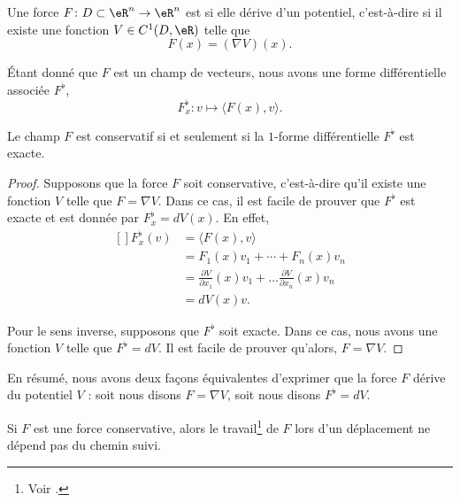 \begin{definition}
	Une force \( F\colon D\subset\eR^n\to \eR^n\) est  si elle dérive d'un potentiel, c'est-à-dire si il existe une fonction \( V\in C^1(D,\eR)\) telle que
	\begin{equation}
		F(x)=(\nabla V)(x).
	\end{equation}
\end{definition}
Étant donné que \( F\) est un champ de vecteurs, nous avons une forme différentielle associée \( F^{\flat}\),
\begin{equation}
	F^{\flat}_x\colon v\mapsto \langle F(x), v\rangle .
\end{equation}

\begin{lemma}
	Le champ \( F\) est conservatif si et seulement si la \( 1\)-forme différentielle \( F^{\flat}\) est exacte.
\end{lemma}

\begin{proof}
	Supposons que la force \( F\) soit conservative, c'est-à-dire qu'il existe une fonction \( V\) telle que \( F=\nabla V\). Dans ce cas, il est facile de prouver que \( F^{\flat}\) est exacte et est donnée par \( F_x^{\flat}=dV(x)\). En effet,
	\begin{equation}
		\begin{aligned}[]
			F_x^{\flat}(v) & =\langle F(x), v\rangle                                                                    \\
			               & =F_1(x)v_1+\cdots+F_n(x)v_n                                                                \\
			               & =\frac{ \partial V }{ \partial x_1 }(x)v_1+\ldots\frac{ \partial V }{ \partial x_n }(x)v_n \\
			               & =dV(x)v.
		\end{aligned}
	\end{equation}

	Pour le sens inverse, supposons que \( F^{\flat}\) soit exacte. Dans ce cas, nous avons une fonction \( V\) telle que \( F^{\flat}=dV\). Il est facile de prouver qu'alors, \( F=\nabla V\).
\end{proof}
En résumé, nous avons deux façons équivalentes d'exprimer que la force \( F\) dérive du potentiel \( V\) :  soit nous disons \( F=\nabla V\), soit nous disons \( F^{\flat}=dV\).

\begin{proposition}
	Si \( F\) est une force conservative, alors le travail\footnote{Voir \cite{BIBooTQWKooHJKzlk}.} de \( F\) lors d'un déplacement ne dépend pas du chemin suivi.
\end{proposition}

